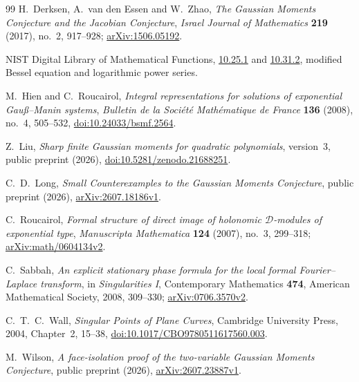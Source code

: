 \documentclass[11pt]{article}
\theoremstyle{definition}\newtheorem{definition}[theorem]{Definition}
\theoremstyle{remark}\newtheorem{remark}[theorem]{Remark}
\begin{document}
\begin{thebibliography}{99}
H.~Derksen, A.~van den Essen and W.~Zhao,
\emph{The Gaussian Moments Conjecture and the Jacobian Conjecture},
\emph{Israel Journal of Mathematics} \textbf{219} (2017), no.~2,
917--928; \href{https://arxiv.org/abs/1506.05192}{arXiv:1506.05192}.

NIST Digital Library of Mathematical Functions,
\href{https://dlmf.nist.gov/10.25.E1}{10.25.1} and
\href{https://dlmf.nist.gov/10.31.E2}{10.31.2},
modified Bessel equation and logarithmic power series.

M.~Hien and C.~Roucairol, \emph{Integral representations for solutions
of exponential Gau\ss--Manin systems},
\emph{Bulletin de la Soci\'et\'e Math\'ematique de France}
\textbf{136} (2008), no.~4, 505--532,
\href{https://doi.org/10.24033/bsmf.2564}{doi:10.24033/bsmf.2564}.

Z.~Liu, \emph{Sharp finite Gaussian moments for quadratic polynomials},
version~3, public preprint (2026),
\href{https://doi.org/10.5281/zenodo.21688251}{doi:10.5281/zenodo.21688251}.

C.~D.~Long, \emph{Small Counterexamples to the Gaussian Moments Conjecture},
public preprint (2026),
\href{https://arxiv.org/abs/2607.18186v1}{arXiv:2607.18186v1}.

C.~Roucairol, \emph{Formal structure of direct image of holonomic
$\mathcal D$-modules of exponential type},
\emph{Manuscripta Mathematica} \textbf{124} (2007), no.~3, 299--318;
\href{https://arxiv.org/abs/math/0604134v2}{arXiv:math/0604134v2}.

C.~Sabbah, \emph{An explicit stationary phase formula for the local
formal Fourier--Laplace transform}, in \emph{Singularities I},
Contemporary Mathematics \textbf{474}, American Mathematical Society,
2008, 309--330;
\href{https://arxiv.org/abs/0706.3570v2}{arXiv:0706.3570v2}.

C.~T.~C.~Wall, \emph{Singular Points of Plane Curves}, Cambridge
University Press, 2004, Chapter~2, 15--38,
\href{https://doi.org/10.1017/CBO9780511617560.003}{doi:10.1017/CBO9780511617560.003}.

M.~Wilson, \emph{A face-isolation proof of the two-variable Gaussian
Moments Conjecture}, public preprint (2026),
\href{https://arxiv.org/abs/2607.23887v1}{arXiv:2607.23887v1}.
\end{thebibliography}
\end{document}
